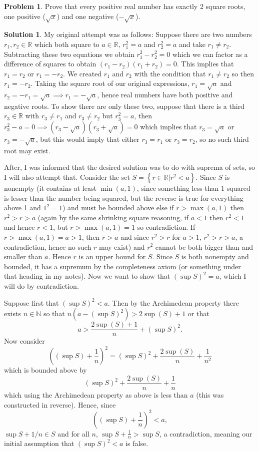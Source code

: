 \documentclass[10pt]{article}
\theoremstyle{definition}
\newtheorem{problem}{Problem}
\newtheorem{soln}{Solution}
\begin{document}
\begin{problem}
Prove that every positive real number has exactly 2 square roots, one positive ($\sqrt{x}$) and one negative ($-\sqrt{x}$).
\end{problem}
\begin{soln}My original attempt was as follows: Suppose there are two numbers $r_1,r_2\in\mathbb{R}$ which both square to $a\in\mathbb{R}$, $r_1^2=a$ and $r_2^2=a$ and take $r_1\neq r_2$.
  Subtracting these two equations we obtain $r_1^2-r_2^2=0$ which we can factor as a difference of squares to obtain
  $(r_1-r_2)(r_1+r_2)=0$. This implies that $r_1=r_2$ or $r_1=-r_2$. We created $r_1$ and $r_2$ with the condition that $r_1\neq r_2$
  so then $r_1=-r_2$. Taking the square root of our original expressions, $r_1=\sqrt{a}$ and $r_2=-r_1=\sqrt{a}\implies r_1=-\sqrt{a}$, hence
  real numbers have both positive and negative roots. To show there are only these two, suppose that there is a third $r_3\in\mathbb{R}$ with
  $r_3\neq r_1$ and $r_3\neq r_2$ but $r_3^2=a$, then $r_3^2-a=0\implies (r_3-\sqrt{a})(r_3+\sqrt{a})=0$ which implies that $r_3=\sqrt{a}$ or
  $r_3=-\sqrt{a}$, but this would imply that either $r_3=r_1$ or $r_3=r_2$, so no such third root may exist.


  After, I was informed that the desired solution was to do with suprema of sets, so I will also attempt that.
  Consider the set $S=\left\{r\in \mathbb{R}|r^2<a\right\}$. Since $S$ is nonempty (it contains at least $\min(a,1)$,
  since something less than 1 squared is lesser than the number being squared, but the reverse is true for everything above 1 and $1^2=1$)
  and must be bounded above else if $r>\max(a,1)$ then $r^2>r>a$ (again by the same shrinking square reasoning,
  if $a<1$ then $r^2<1$ and hence $r<1$, but $r>\max(a,1)=1$ so contradiction. If $r>\max(a,1)=a>1$, then
  $r>a$ and since $r^2>r$ for $a>1$, $r^2>r>a$, a contradiction, hence no such $r$ may exist) and $r^2$ cannot be both bigger
  than and smaller than $a$. Hence $r$ is an upper bound for $S$. Since $S$ is both nonempty and bounded, it has a supremum by the completeness axiom
  (or something under that heading in my notes). Now we want to show that $(\sup S)^2=a$, which I will do by contradiction. 
  
  Suppose first that
  $(\sup S)^2<a$. Then by the Archimedean property there exists $n\in\mathbb{N}$ so that
  $n(a-(\sup S)^2)>2\sup (S)+1$ or that 
  $$a>\frac{2\sup(S)+1}{n}+(\sup S)^2.$$
  Now consider
  $$((\sup S) + \frac{1}{n})^2=(\sup S)^2+\frac{2\sup (S)}{n}+\frac{1}{n^2}$$
  which is bounded above by
  $$(\sup S)^2+\frac{2\sup (S)}{n}+\frac{1}{n}$$
  which using the Archimedean property as above is less than $a$ (this was constructed in reverse).
  Hence, since $$((\sup S) + \frac{1}{n})^2<a,$$
  $\sup S + 1/n\in S$ and for all $n$, $\sup S + \frac{1}{n}>\sup S$, a contradiction, meaning our initial assumption that
  $(\sup S)^2<a$ is false.



\end{soln}
\end{document}

